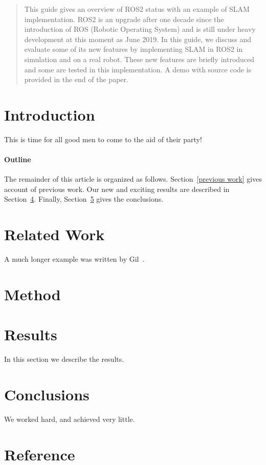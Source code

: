 \documentclass[12pt]{article}
\begin{document}
\maketitle

\begin{abstract}
 This guide gives an overview of ROS2 status with an example of SLAM implementation. ROS2 is an upgrade after one decade since the introduction of ROS (Robotic Operating System) and is still under heavy development at this moment as June 2019. In this guide, we discuss and evaluate some of its new features by implementing SLAM in ROS2 in simulation and on a real robot. These new features are briefly introduced and some are tested in this implementation. A demo with source code is provided in the end of the paper.
\end{abstract}

\section{Introduction}
This is time for all good men to come to the aid of their party!

\paragraph{Outline}
The remainder of this article is organized as follows.
Section~\ref{previous work} gives account of previous work.
Our new and exciting results are described in Section~\ref{results}.
Finally, Section~\ref{conclusions} gives the conclusions.

\section{Related Work}\label{related Work}
A much longer \LaTeXe{} example was written by Gil~\cite{Gil:02}.

\section{Method}\label{method}
\section{Results}\label{results}
In this section we describe the results.

\section{Conclusions}\label{conclusions}
We worked hard, and achieved very little.

\section{Reference}\label{reference}


\end{document}
